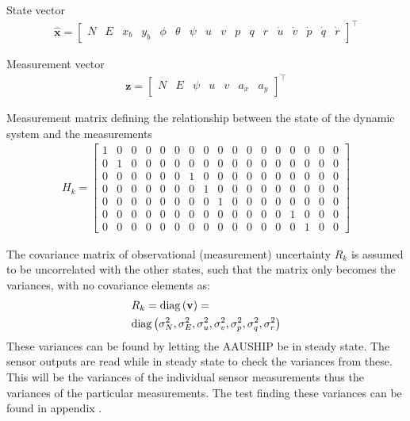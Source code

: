 State vector
\begin{align}
\hat{\mathbf x}=
\begin{bmatrix}
N & E & x_b & y_b & \phi & \theta & \psi & u & v & p & q & r & \dot u & \dot v & \dot p & \dot q & \dot r
\end{bmatrix}^\top
\end{align}

Measurement vector
\begin{align}
\mathbf z=
\begin{bmatrix}
N & E & \psi & u & v & a_x & a_y
\end{bmatrix}^\top
\end{align}

Measurement matrix defining the relationship between the state of the dynamic system and the measurements
\begin{align}
H_k =
\begin{bmatrix}
1 & 0 & 0 & 0 & 0 & 0 & 0 & 0 & 0 & 0 & 0 & 0 & 0 & 0 & 0 & 0 & 0 \\
0 & 1 & 0 & 0 & 0 & 0 & 0 & 0 & 0 & 0 & 0 & 0 & 0 & 0 & 0 & 0 & 0 \\
0 & 0 & 0 & 0 & 0 & 0 & 1 & 0 & 0 & 0 & 0 & 0 & 0 & 0 & 0 & 0 & 0 \\
0 & 0 & 0 & 0 & 0 & 0 & 0 & 1 & 0 & 0 & 0 & 0 & 0 & 0 & 0 & 0 & 0 \\
0 & 0 & 0 & 0 & 0 & 0 & 0 & 0 & 1 & 0 & 0 & 0 & 0 & 0 & 0 & 0 & 0 \\
0 & 0 & 0 & 0 & 0 & 0 & 0 & 0 & 0 & 0 & 0 & 0 & 0 & 1 & 0 & 0 & 0 \\
0 & 0 & 0 & 0 & 0 & 0 & 0 & 0 & 0 & 0 & 0 & 0 & 0 & 0 & 1 & 0 & 0 
\end{bmatrix}
\end{align}

The covariance matrix of observational (measurement) uncertainty $R_k$ is assumed to be uncorrelated with the other states, such that the matrix only becomes the variances, with no covariance elements as:
\begin{align}
&R_k = \mathrm{diag}\left(\mathbf{v}\right) =\\\nonumber
&\mathrm{diag}\left(\sigma_{N}^2, \sigma_{E}^2, \sigma_{u}^2, \sigma_{v}^2, \sigma_p^2, \sigma_q^2, \sigma_r^2\right)
\end{align}
These variances can be found by letting the AAUSHIP be in steady state. The sensor outputs are read while in steady state to check the variances from these. This will be the variances of the individual sensor measurements thus the variances of the particular measurements. The test finding these variances can be found in appendix .

